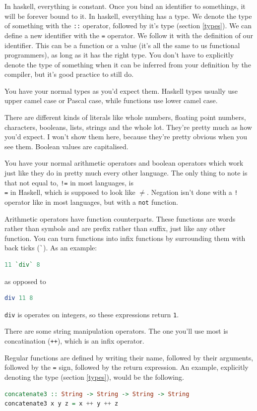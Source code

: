 \documentclass[11pt]{article}
\begin{document}
In haskell, everything is constant. Once you bind an identifier to somethings,
it will be forever bound to it. In haskell, everything has a type. We denote
the type of something with the \texttt{::} operator, followed by it's type
(section \ref{types}). We can define a new identifier with the \texttt{=}
operator. We follow it with the definition of our identifier. This can be a
function or a value (it's all the same to us functional programmers), as long
as it has the right type. You don't have to explicitly denote the type of
something when it can be inferred from your definition by the compiler, but
it's good practice to still do.

You have your normal types as you'd expect them. Haskell types usually use
upper camel case or Pascal case, while functions use lower camel case.

There are different kinds of literals like whole numbers, floating point
numbers, characters, booleans, lists, strings and the whole lot. They're pretty
much as how you'd expect. I won't show them here, because they're pretty
obvious when you see them. Boolean values are capitalised.

You have your normal arithmetic operators and boolean operators which work just
like they do in pretty much every other language. The only thing to note is
that not equal to, \texttt{!=} in most languages, is \texttt{\\=} in Haskell,
which is supposed to look like \(\neq\). Negation isn't done with a \texttt{!}
operator like in most languages, but with a \texttt{not} function.

Arithmetic operators have function counterparts. These functions are words
rather than symbols and are prefix rather than suffix, just like any other
function. You can turn functions into infix functions by surrounding them with
back ticks (\texttt{\`}). As an example:
\begin{lstlisting}[language=Haskell]
11 `div` 8
\end{lstlisting}
as opposed to
\begin{lstlisting}[language=Haskell]
div 11 8
\end{lstlisting}
\texttt{div} is operates on integers, so these expressions return \texttt{1}.

There are some string manipulation operators. The one you'll use most is
concatination (\texttt{++}), which is an infix operator.

Regular functions are defined by writing their name, followed by their
arguments, followed by the \texttt{=} sign, followed by the return expression.
An example, explicitly denoting the type (section \ref{types}), would be the
following.
\begin{lstlisting}[language=Haskell]
concatenate3 :: String -> String -> String -> String
concatenate3 x y z = x ++ y ++ z
\end{lstlisting}
\end{document}
